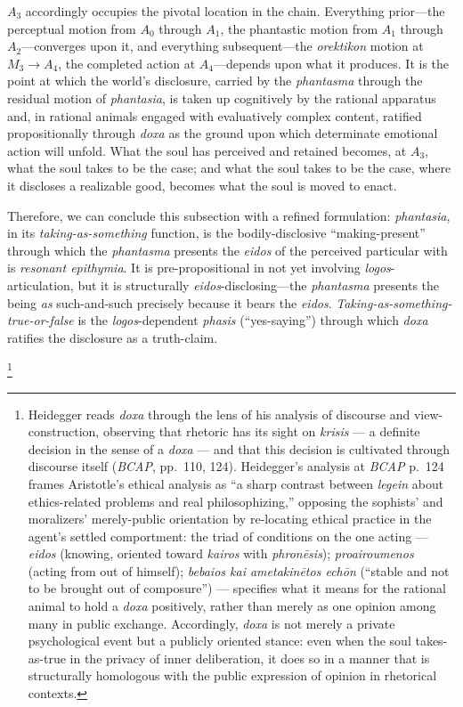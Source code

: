 \documentclass{article}
\begin{document}
$A_3$ accordingly occupies the pivotal location in the chain. Everything prior---the perceptual motion from $A_0$ through $A_1$, the phantastic motion from $A_1$ through $A_2$---converges upon it, and everything subsequent---the \textit{orektikon} motion at $M_3 \rightarrow A_4$, the completed action at $A_4$---depends upon what it produces. It is the point at which the world's disclosure, carried by the \textit{phantasma} through the residual motion of \textit{phantasia}, is taken up cognitively by the rational apparatus and, in rational animals engaged with evaluatively complex content, ratified propositionally through \textit{doxa} as the ground upon which determinate emotional action will unfold. What the soul has perceived and retained becomes, at $A_3$, what the soul takes to be the case; and what the soul takes to be the case, where it discloses a realizable good, becomes what the soul is moved to enact.

Therefore, we can conclude this subsection with a refined formulation: \textit{phantasia}, in its \textit{taking-as-something} function, is the bodily-disclosive ``making-present'' through which the \textit{phantasma} presents the \textit{eidos} of the perceived particular with is \textit{resonant epithymia}. It is pre-propositional in not yet involving  \textit{logos}-articulation, but it is structurally \textit{eidos}-disclosing---the \textit{phantasma} presents the being \textit{as} such-and-such precisely because it bears the \textit{eidos}. \textit{Taking-as-something-true-or-false} is the \textit{logos}-dependent \textit{phasis} (``yes-saying'') through which \textit{doxa} ratifies the disclosure as a truth-claim. 

\footnote{Heidegger reads \textit{doxa} through the lens of his analysis of discourse and view-construction, observing that rhetoric has its sight on \textit{krisis} --- a definite decision in the sense of a \textit{doxa} --- and that this decision is cultivated through discourse itself (\textit{BCAP}, pp.~110, 124). Heidegger's analysis at \textit{BCAP} p.~124 frames Aristotle's ethical analysis as ``a sharp contrast between \textit{legein} about ethics-related problems and real philosophizing,'' opposing the sophists' and moralizers' merely-public orientation by re-locating ethical practice in the agent's settled comportment: the triad of conditions on the one acting --- \textit{eidos} (knowing, oriented toward \textit{kairos} with \textit{phron\=esis}); \textit{proairoumenos} (acting from out of himself); \textit{bebaios kai ametakin\=etos echōn} (``stable and not to be brought out of composure'') --- specifies what it means for the rational animal to hold a \textit{doxa} positively, rather than merely as one opinion among many in public exchange. Accordingly, \textit{doxa} is not merely a private psychological event but a publicly oriented stance: even when the soul takes-as-true in the privacy of inner deliberation, it does so in a manner that is structurally homologous with the public expression of opinion in rhetorical contexts.}
\end{document}
